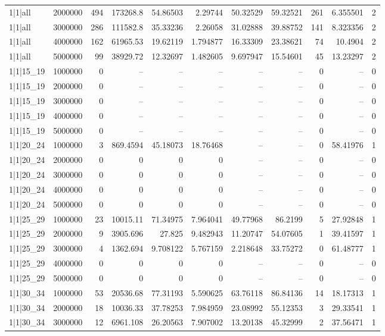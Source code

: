 \begin{tabular}{lrrrrrrrrrr}
1|1|all & 2000000 & 494 & 173268.8 & 54.86503 & 2.29744 & 50.32529 & 59.32521 & 261 & 6.355501 & 2 \\
1|1|all & 3000000 & 286 & 111582.8 & 35.33236 & 2.26058 & 31.02888 & 39.88752 & 141 & 8.323356 & 2 \\
1|1|all & 4000000 & 162 & 61965.53 & 19.62119 & 1.794877 & 16.33309 & 23.38621 & 74 & 10.4904 & 2 \\
1|1|all & 5000000 & 99 & 38929.72 & 12.32697 & 1.482605 & 9.697947 & 15.54601 & 45 & 13.23297 & 2 \\
1|1|15\_19 & 1000000 & 0 & -- & -- & -- & -- & -- & 0 & -- & 0 \\
1|1|15\_19 & 2000000 & 0 & -- & -- & -- & -- & -- & 0 & -- & 0 \\
1|1|15\_19 & 3000000 & 0 & -- & -- & -- & -- & -- & 0 & -- & 0 \\
1|1|15\_19 & 4000000 & 0 & -- & -- & -- & -- & -- & 0 & -- & 0 \\
1|1|15\_19 & 5000000 & 0 & -- & -- & -- & -- & -- & 0 & -- & 0 \\
1|1|20\_24 & 1000000 & 3 & 869.4594 & 45.18073 & 18.76468 & -- & -- & 0 & 58.41976 & 1 \\
1|1|20\_24 & 2000000 & 0 & 0 & 0 & 0 & -- & -- & 0 & -- & 0 \\
1|1|20\_24 & 3000000 & 0 & 0 & 0 & 0 & -- & -- & 0 & -- & 0 \\
1|1|20\_24 & 4000000 & 0 & 0 & 0 & 0 & -- & -- & 0 & -- & 0 \\
1|1|20\_24 & 5000000 & 0 & 0 & 0 & 0 & -- & -- & 0 & -- & 0 \\
1|1|25\_29 & 1000000 & 23 & 10015.11 & 71.34975 & 7.964041 & 49.77968 & 86.2199 & 5 & 27.92848 & 1 \\
1|1|25\_29 & 2000000 & 9 & 3905.696 & 27.825 & 9.482943 & 11.20747 & 54.07605 & 1 & 39.41597 & 1 \\
1|1|25\_29 & 3000000 & 4 & 1362.694 & 9.708122 & 5.767159 & 2.218648 & 33.75272 & 0 & 61.48777 & 1 \\
1|1|25\_29 & 4000000 & 0 & 0 & 0 & 0 & -- & -- & 0 & -- & 0 \\
1|1|25\_29 & 5000000 & 0 & 0 & 0 & 0 & -- & -- & 0 & -- & 0 \\
1|1|30\_34 & 1000000 & 53 & 20536.68 & 77.31193 & 5.590625 & 63.76118 & 86.84136 & 14 & 18.17313 & 1 \\
1|1|30\_34 & 2000000 & 18 & 10036.33 & 37.78253 & 7.984959 & 23.08992 & 55.12353 & 3 & 29.33541 & 1 \\
1|1|30\_34 & 3000000 & 12 & 6961.108 & 26.20563 & 7.907002 & 13.20138 & 45.32999 & 2 & 37.56471 & 1 \\

\end{tabular}
